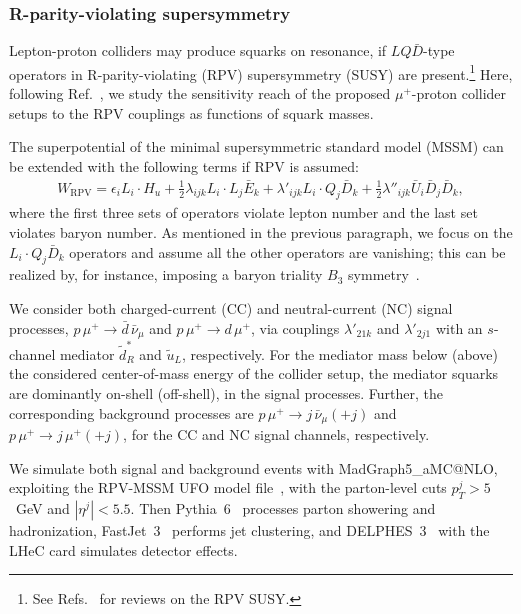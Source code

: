 \documentclass[a4paper,11pt]{article}
\makeatletter
\newcommand{\mgamcnlo}{MadGraph5\_aMC@NLO}
\makeatother
\begin{document}
\subsubsection{R-parity-violating supersymmetry}

Lepton-proton colliders may produce squarks on resonance, if $LQ\bar{D}$-type operators in R-parity-violating (RPV) supersymmetry (SUSY) are present.\footnote{See Refs.~\cite{Dreiner:1998mxa,Barbier:2004ez,Mohapatra:2015fua} for reviews on the RPV SUSY.}
Here, following Ref.~\cite{Cheung:2021iev}, we study the sensitivity reach of the proposed $\mu^+$-proton collider setups to the RPV couplings as functions of squark masses.


The superpotential of the minimal supersymmetric standard model (MSSM) can be extended with the following terms if RPV is assumed:
\begin{eqnarray}
    W_{\text{RPV}} =\epsilon_i L_i\cdot H_u + \frac{1}{2}\lambda_{ijk}L_i\cdot L_j \bar{E}_k + \lambda'_{ijk} L_i\cdot Q_j \bar{D}_k + \frac{1}{2}\lambda''_{ijk} \bar{U}_i \bar{D}_j \bar{D}_k,
\end{eqnarray}
where the first three sets of operators violate lepton number and the last set violates baryon number.
As mentioned in the previous paragraph, we focus on the $L_i\cdot Q_j \bar{D}_k$ operators and assume all the other operators are vanishing; this can be realized by, for instance, imposing a baryon triality $B_3$ symmetry~\cite{Ibanez:1991pr,Dreiner:2012ae}.


We consider both charged-current (CC) and neutral-current (NC) signal processes, $p\, \mu^+\to \bar{d} \, \bar{\nu}_\mu$ and $p\, \mu^+\to d\, \mu^+$, via couplings $\lambda'_{21k}$ and $\lambda'_{2j1}$ with an $s$-channel mediator $\tilde{d}_R^*$ and $\tilde{u}_L$, respectively.
For the mediator mass below (above) the considered center-of-mass energy of the collider setup, the mediator squarks are dominantly on-shell (off-shell), in the signal processes.
Further, the corresponding background processes are $p\, \mu^+ \to j\, \bar{\nu}_\mu(+j)$ and $p\,\mu^+\to j \, \mu^+(+j)$, for the CC and NC signal channels, respectively.


We simulate both signal and background events with \mgamcnlo, exploiting the RPV-MSSM UFO model file~\cite{Monteux:2016gag}, with the parton-level cuts $p_T^j>5$~GeV and $|\eta^j|<5.5$.
Then Pythia~6~\cite{Sjostrand:2006za} processes parton showering and hadronization, FastJet~3~\cite{Cacciari:2011ma,Cacciari:2005hq} performs jet clustering, and DELPHES~3~\cite{deFavereau:2013fsa} with the LHeC card simulates detector effects.
\end{document}
